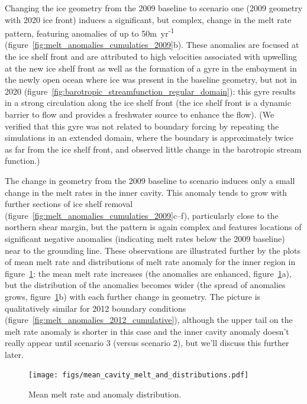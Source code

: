 \documentclass[draft]{agujournal2019}
\begin{document}
Changing the ice geometry from the 2009 baseline to scenario one (2009 geometry with 2020 ice front) induces a significant, but complex, change in the melt rate pattern, featuring anomalies of up to 50m~yr\textsuperscript{-1} (figure~\ref{fig:melt_anomalies_cumulaties_2009}b). These anomalies are focused at the ice shelf front and are attributed to high velocities associated with upwelling at the new ice shelf front as well as the formation of a gyre in the embayment in the newly open ocean where ice was present in the baseline geometry, but not in 2020 (figure~\ref{fig:barotropic_streamfunction_regular_domain}): this gyre results in a strong circulation along the ice shelf front (the ice shelf front is a dynamic barrier to flow and provides a freshwater source to enhance the flow).
(We verified that this gyre was not related to boundary forcing by repeating the simulations in an extended domain, where the boundary is approximately twice as far from the ice shelf front, and observed little change in the barotropic stream function.) 

The change in geometry from the 2009 baseline to scenario induces only a small change in the melt rates in the inner cavity. This anomaly tends to grow with further sections of ice shelf removal (figure~\ref{fig:melt_anomalies_cumulaties_2009}c--f), particularly close to the northern shear margin, but the pattern is again complex and features locations of significant negative anomalies (indicating melt rates below the 2009 baseline) near to the grounding line. These observations are illustrated further by the plots of mean melt rate and distributions of melt rate anomaly for the inner region in figure~\ref{fig:mean_melt_rate_and_anomaly_distribution}: the mean melt rate increases (the anomalies are enhanced, figure~\ref{fig:mean_melt_rate_and_anomaly_distribution}a), but the distribution of the anomalies becomes wider (the spread of anomalies grows, figure~\ref{fig:mean_melt_rate_and_anomaly_distribution}b) with each further change in geometry. The picture is qualitatively similar for 2012 boundary conditions (figure~\ref{fig:melt_anomalies_2012_cumulative}), although the upper tail on the melt rate anomaly is shorter in this case and the inner cavity anomaly doesn't really appear until scenario 3 (versus scenario 2), but we'll discuss this further later. 

\begin{figure}
    \centering
    \texttt{[image: figs/mean\_cavity\_melt\_and\_distributions.pdf]}
    \caption{Mean melt rate and anomaly distribution. }
    \label{fig:mean_melt_rate_and_anomaly_distribution}
\end{figure}
\end{document}

